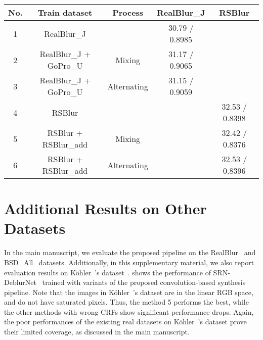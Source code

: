 \setlength{\tabcolsep}{5pt}
\begin{table}[t]
\centering
\caption{Comparison of different training strategies using additional synthetic datasets for further performance improvements.}
\label{tbl:training_process}
\end{table}

\begin{tabular}{|c|cc|cc|}
\hline
No. & Train dataset          & Process     & RealBlur\_J    & RSBlur         \\ \hline
1   & RealBlur\_J            &             & 30.79 / 0.8985 &                \\
2   & RealBlur\_J + GoPro\_U & Mixing      & 31.17 / 0.9065 &                \\
3   & RealBlur\_J + GoPro\_U & Alternating & 31.15 / 0.9059 &                \\ \hline
4   & RSBlur                 &             &                & 32.53 / 0.8398 \\
5   & RSBlur + RSBlur\_add   & Mixing      &                & 32.42 / 0.8376 \\
6   & RSBlur + RSBlur\_add   & Alternating &                & 32.53 / 0.8396 \\ \hline
\end{tabular}
\fi


\section{Additional Results on Other Datasets}

In the main manuscript, we evaluate the proposed pipeline on the RealBlur~\cite{jsrim-ECCV2020} and BSD\_All~\cite{Zhong_2020_ECCV,Zhong_2021_arxiv} datasets.
Additionally, in this supplementary material, we also report evaluation results on K\"{o}hler~\etal's dataset~\cite{Kohler-ECCV12}.
 shows the performance of SRN-DeblurNet~\cite{Tao-CVPR18} trained with variants of the proposed convolution-based synthesis pipeline.
Note that the images in K\"{o}hler~\etal's dataset are in the linear RGB space, and do not have saturated pixels.
Thus, the method 5 performs the best, while the other methods with wrong CRFs show significant performance drops.
Again, the poor performances of the existing real datasets on K\"{o}hler~\etal's dataset prove their limited coverage, as discussed in the main manuscript.

